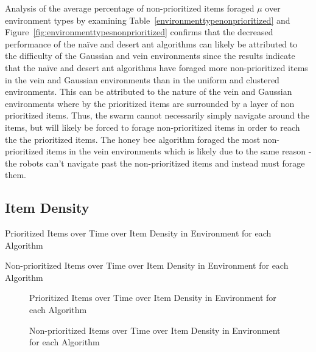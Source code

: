 Analysis of the average percentage of non-prioritized items foraged $\mu$ over environment types by examining Table~\ref{environmenttypenonprioritized} and Figure~\ref{fig:environmenttypesnonprioritized} confirms  that the decreased performance of the na\"ive and desert ant algorithms can likely be attributed to the difficulty of the Gaussian and vein environments since the results indicate that the na\"ive and desert ant algorithms have foraged more non-prioritized items in the vein and Gaussian environments than in the uniform and clustered environments. This can be attributed to the nature of the vein and Gaussian environments where by the prioritized items are surrounded by a layer of non prioritized items. Thus, the swarm cannot necessarily simply navigate around the items, but will likely be forced to forage non-prioritized items in order to reach the the prioritized items. The honey bee algorithm foraged the most non-prioritized items in the vein environments which is likely due to the same reason - the robots can't navigate past the non-prioritized items and instead must forage them. 

\subsection{Item Density}
\label{results:itemdensity}

\begin{table} [h]
     \caption{Prioritized Items over Time over Item Density in Environment for each Algorithm}
     \label{itemdensityprioritized}
	\centering
	\footnotesize
	
\end{table}

\begin{table} [h]
     \caption{Non-prioritized Items over Time over Item Density in Environment for each Algorithm}
     \label{itemdensitynonprioritized}
	\centering
	\footnotesize
	
\end{table}


\begin{figure}[!htb]
\centering
\resizebox{\textwidth}{!}{}
\caption{Prioritized Items over Time over Item Density in Environment  for each Algorithm}
\label{objectgoldplot}
\end{figure}


\begin{figure}[!htb]
\centering
\resizebox{\textwidth}{!}{}
\caption{Non-prioritized Items over Time over Item Density in Environment for each Algorithm}
\label{objectwasteplot}
\end{figure}

